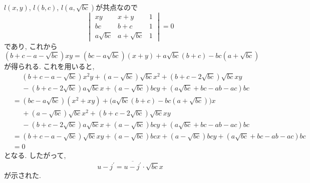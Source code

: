 \begin{ifsol*}
$l(x,y)$, $l(b,c)$, $l(a,\sqrt{bc})$が共点なので
\[\begin{vmatrix}
xy&x+y&1\\
bc&b+c&1\\
a\sqrt{bc}&a+\sqrt{bc}&1
\end{vmatrix}=0\]
であり, これから
\[(b+c-a-\sqrt{bc})xy=(bc-a\sqrt{bc})(x+y)+a\sqrt{bc}(b+c)-bc(a+\sqrt{bc})\]
が得られる.
これを用いると,
\begin{align*}
&\phantom{={}}(b+c-a-\sqrt{bc})x^2y+(a-\sqrt{bc})\sqrt{bc}x^2+(b+c-2\sqrt{bc})\sqrt{bc}xy\\
&\phantom{={}}-(b+c-2\sqrt{bc})a\sqrt{bc}x+(a-\sqrt{bc})bcy+(a\sqrt{bc}+bc-ab-ac)bc\\
&=(bc-a\sqrt{bc})(x^2+xy)+\bigl(a\sqrt{bc}(b+c)-bc(a+\sqrt{bc})\bigr)x\\
&\phantom{={}}+(a-\sqrt{bc})\sqrt{bc}x^2+(b+c-2\sqrt{bc})\sqrt{bc}xy\\
&\phantom{={}}-(b+c-2\sqrt{bc})a\sqrt{bc}x+(a-\sqrt{bc})bcy+(a\sqrt{bc}+bc-ab-ac)bc\\
&=(b+c-a-\sqrt{bc})\sqrt{bc}xy+(a-\sqrt{bc})bcx+(a-\sqrt{bc})bcy+(a\sqrt{bc}+bc-ab-ac)bc\\
&=0
\end{align*}
となる.
したがって,
\[u-j^\prime=\overline{u-j^\prime}\cdot\sqrt{bc}x\]
が示された.
\end{ifsol*}